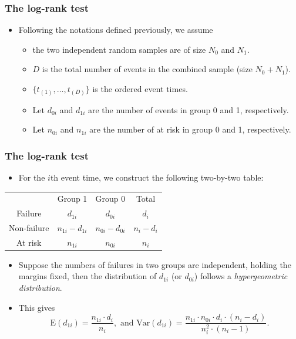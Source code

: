 \documentclass[10pt]{beamer}\usepackage[]{graphicx}\usepackage[]{color}
\newcommand{\Var}{\mathrm{Var}}
\newcommand{\E}{\mathrm{E}}
\begin{document}
\begin{frame}
  \frametitle{The log-rank test}
  \begin{itemize}
  \item Following the notations defined previously, 
    we assume
    \begin{itemize} 
    \item the two independent random samples are of size $N_0$ and $N_1$.
    \item $D$ is the total number of events in the combined sample (size $N_0 + N_1$).     
    \item $\{t_{(1)}, \ldots, t_{(D)}\}$ is the ordered event times. 
    \item Let $d_{0i}$ and $d_{1i}$ are the number of events in group 0 and 1, respectively.
    \item Let $n_{0i}$ and $n_{1i}$ are the number of at risk in group 0 and 1, respectively.
    \end{itemize}
  \end{itemize}
\end{frame}

\begin{frame}
  \frametitle{The log-rank test}
  \begin{itemize}
  \item For the $i$th event time, we construct the following two-by-two table:
  \end{itemize}
  \renewcommand{\arraystretch}{1.3}
  \begin{center}
    \begin{tabular}{cccc}
      &Group 1&Group 0& Total\\
      \cline{2-3}
      Failure &\multicolumn{1}{|c|}{$d_{1i}$}&\multicolumn{1}{|c|}{$d_{0i}$}&$d_i$\\
      \cline{2-3}
      Non-failure &\multicolumn{1}{|c|}{$n_{1i}-d_{1i}$}&\multicolumn{1}{|c|}{$n_{0i}-d_{0i}$}&$n_i-d_i$\\
      \cline{2-3}
      At risk & $n_{1i}$ &  $n_{0i}$ & $n_i$\\
    \end{tabular}
  \end{center}
  \begin{itemize}
  \item Suppose the numbers of failures in two groups are independent, 
    holding the margins fixed, %
    then the distribution of $d_{1i}$ (or $d_{0i}$) follows a \emph{hypergeometric distribution}. 
  \item This gives
    \begin{equation*}
      \E(d_{1i}) = \frac{n_{1i} \cdot d_i}{n_i}, \mbox{ and } \Var(d_{1i}) = \frac{n_{1i}\cdot n_{0i}\cdot d_i\cdot(n_i - d_i)}{n_i^2\cdot(n_i-1)}.
    \end{equation*}
  \end{itemize}
\end{frame}
\end{document}
